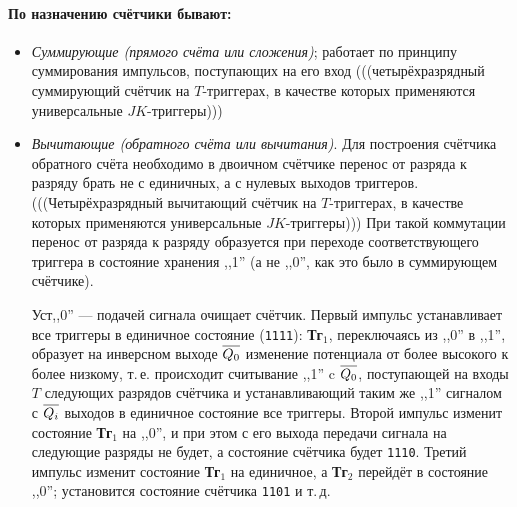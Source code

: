 \documentclass[10pt,a4paper,titlepage]{article}
\begin{document}
\paragraph{По назначению счётчики бывают:}
\begin{itemize}
\item \textit{Суммирующие (прямого счёта или сложения)}; работает по принципу суммирования импульсов, поступающих на его вход (((четырёхразрядный суммирующий счётчик на $T$-триггерах, в качестве которых применяются универсальные $JK$-триггеры)))
\item \textit{Вычитающие (обратного счёта или вычитания)}.
Для построения счётчика обратного счёта необходимо в двоичном счётчике перенос от разряда к разряду брать не с единичных, а с нулевых выходов триггеров.
(((Четырёхразрядный вычитающий счётчик на $T$-триггерах, в качестве которых применяются универсальные $JK$-триггеры)))
При такой коммутации перенос от разряда к разряду образуется при переходе соответствующего триггера в состояние хранения ,,1'' (а не ,,0'', как это было в суммирующем счётчике).

Уст,,0'' --- подачей сигнала очищает счётчик.
Первый импульс устанавливает все триггеры в единичное состояние (\texttt{1111}): \textbf{Тг$_1$}, переключаясь из ,,0'' в ,,1'', образует на инверсном выходе $\overline{\mathstrut Q_0}$ изменение потенциала от более высокого к более низкому, т.\,е. происходит считывание ,,1'' c $\overline{\mathstrut Q_0}$, поступающей на входы $T$ следующих разрядов счётчика и устанавливающий таким же ,,1'' сигналом с $\overline{\mathstrut Q_i}$ выходов в единичное состояние все триггеры.
Второй импульс изменит состояние \textbf{Тг$_1$} на ,,0'', и при этом с его выхода передачи сигнала на следующие разряды не будет, а состояние счётчика будет \texttt{1110}.
Третий импульс изменит состояние \textbf{Тг$_1$} на единичное, а \textbf{Тг$_2$} перейдёт в состояние ,,0''; установится состояние счётчика \texttt{1101} и т.\,д.


\end{itemize}
\end{document}
